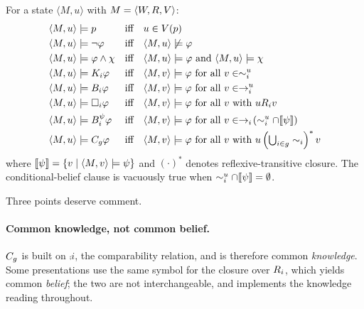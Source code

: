 \documentclass[11pt,a4paper]{article}
\begin{document}
\begin{definition}[Satisfaction]
\label{def:sat}
For a state $\langle M, u\rangle$ with $M = \langle W, R, V\rangle$:
\begin{align}
  \langle M,u\rangle &\models p
    &&\text{iff}\quad u \in V(p) \\
  \langle M,u\rangle &\models \neg\varphi
    &&\text{iff}\quad \langle M,u\rangle \not\models \varphi \\
  \langle M,u\rangle &\models \varphi \wedge \chi
    &&\text{iff}\quad \langle M,u\rangle \models \varphi
       \text{ and } \langle M,u\rangle \models \chi \\
  \langle M,u\rangle &\models K_{i}\varphi
    &&\text{iff}\quad \langle M,v\rangle \models \varphi
       \text{ for all } v \in \sim_{i}^{u} \\
  \langle M,u\rangle &\models B_{i}\varphi
    &&\text{iff}\quad \langle M,v\rangle \models \varphi
       \text{ for all } v \in \rightarrow_{i}^{u} \\
  \langle M,u\rangle &\models \Box_{i}\varphi
    &&\text{iff}\quad \langle M,v\rangle \models \varphi
       \text{ for all } v \text{ with } u R_{i} v \\
  \langle M,u\rangle &\models B^{\psi}_{i}\varphi
    &&\text{iff}\quad \langle M,v\rangle \models \varphi
       \text{ for all } v \in \rightarrow_{i}\!\left(\sim_{i}^{u} \cap [\![ \psi ]\!]\right) \\
  \langle M,u\rangle &\models C_{g}\varphi
    &&\text{iff}\quad \langle M,v\rangle \models \varphi
       \text{ for all } v \text{ with } u \left(\textstyle\bigcup_{i \in g} \sim_{i}\right)^{*} v
\end{align}
where $[\![ \psi ]\!] = \{v \mid \langle M,v\rangle \models \psi\}$ and $(\cdot)^{*}$ denotes
reflexive-transitive closure. The conditional-belief clause is vacuously true when
$\sim_{i}^{u} \cap [\![ \psi ]\!] = \emptyset$.
\end{definition}

Three points deserve comment.

\paragraph{Common knowledge, not common belief.}
$C_{g}$ is built on $\comp{i}$, the comparability relation, and is therefore common
\emph{knowledge}. Some presentations use the same symbol for the closure over $R_{i}$,
which yields common \emph{belief}; the two are not interchangeable, and \delhi{} implements
the knowledge reading throughout.
\end{document}
